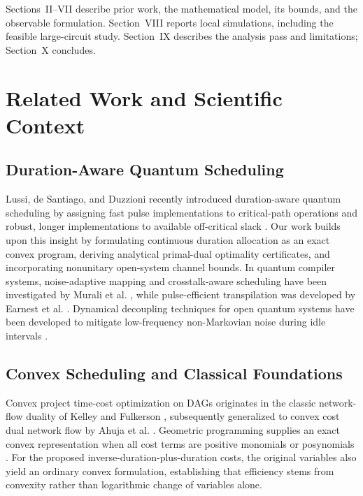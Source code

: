 \documentclass[10pt,letterpaper,journal]{IEEEtran}
\begin{document}
Sections~II--VII describe prior work, the mathematical model, its bounds, and the observable formulation. Section~VIII reports local simulations, including the feasible large-circuit study. Section~IX describes the analysis pass and limitations; Section~X concludes.

\section{Related Work and Scientific Context}
\subsection{Duration-Aware Quantum Scheduling}
Lussi, de Santiago, and Duzzioni recently introduced duration-aware quantum scheduling by assigning fast pulse implementations to critical-path operations and robust, longer implementations to available off-critical slack \cite{lussi}. Our work builds upon this insight by formulating continuous duration allocation as an exact convex program, deriving analytical primal-dual optimality certificates, and incorporating nonunitary open-system channel bounds. In quantum compiler systems, noise-adaptive mapping and crosstalk-aware scheduling have been investigated by Murali et al. \cite{murali_noise,murali_crosstalk}, while pulse-efficient transpilation was developed by Earnest et al. \cite{earnest}. Dynamical decoupling techniques for open quantum systems have been developed to mitigate low-frequency non-Markovian noise during idle intervals \cite{viola_dd,qiskit_sched}.

\subsection{Convex Scheduling and Classical Foundations}
Convex project time-cost optimization on DAGs originates in the classic network-flow duality of Kelley \cite{kelley} and Fulkerson \cite{fulkerson}, subsequently generalized to convex cost dual network flow by Ahuja et al. \cite{ahuja}. Geometric programming supplies an exact convex representation when all cost terms are positive monomials or posynomials \cite{boydgp}. For the proposed inverse-duration-plus-duration costs, the original variables also yield an ordinary convex formulation, establishing that efficiency stems from convexity rather than logarithmic change of variables alone.
\end{document}

